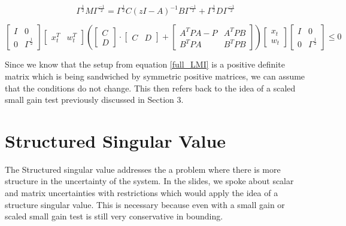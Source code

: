 \documentclass{article}[12pt]
\begin{document}
\begin{equation}
    \label{scaling}
    \Gamma^{\frac{1}{2}} M \Gamma ^{\frac{-1}{2}} = \Gamma^{\frac{1}{2}} C (zI-A)^{-1} B \Gamma^{\frac{-1}{2}} + \Gamma^{\frac{1}{2}}D\Gamma^{\frac{-1}{2}}
\end{equation}

\begin{equation}
    \label{PP_mult}
        \begin{bmatrix}
    I & 0\\
    0 & \Gamma^{\frac{1}{2}}
    \end{bmatrix}
        \begin{bmatrix}
        x_t^T & w_t^T
        \end{bmatrix}
        \left( \begin{bmatrix}
        C \\
        D
    \end{bmatrix} \cdot \begin{bmatrix}
        C & D
    \end{bmatrix} +
        \begin{bmatrix}
        A^{T}PA - P & A^T PB \\
         B^{T}PA & B^T PB
    \end{bmatrix} \right) 
    \begin{bmatrix}
        x_t \\
        w_t
        \end{bmatrix} 
         \begin{bmatrix}
    I & 0\\
    0 & \Gamma^{\frac{1}{2}}
    \end{bmatrix} \leq 0    
\end{equation}

\noindent Since we know that the setup from equation \ref{full_LMI} is a positive definite matrix which is being sandwiched by symmetric positive matrices, we can assume that the conditions do not change. This then refers back to the idea  of a scaled small gain test previously discussed in Section 3. 



\section{Structured Singular Value}
The Structured singular value addresses the a problem where there is more structure in the uncertainty of the system. In the slides, we spoke about scalar and matrix uncertainties with restrictions which would apply the idea of a structure singular value. This is necessary because even with a small gain or scaled small gain test is still very conservative in bounding. 
\end{document}
